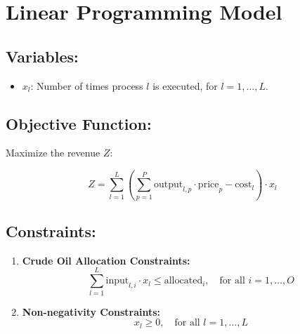 \documentclass{article}
\begin{document}
\section*{Linear Programming Model}

\subsection*{Variables:}
\begin{itemize}
    \item $x_l$: Number of times process $l$ is executed, for $l = 1, \ldots, L$.
\end{itemize}

\subsection*{Objective Function:}
Maximize the revenue $Z$:

\[
Z = \sum_{l=1}^{L} \left( \sum_{p=1}^{P} \text{output}_{l,p} \cdot \text{price}_p - \text{cost}_l \right) \cdot x_l
\]

\subsection*{Constraints:}
\begin{enumerate}
    \item \textbf{Crude Oil Allocation Constraints:}
    \[
    \sum_{l=1}^{L} \text{input}_{l,i} \cdot x_l \leq \text{allocated}_i, \quad \text{for all } i = 1, \ldots, O
    \]
    \item \textbf{Non-negativity Constraints:}
    \[
    x_l \geq 0, \quad \text{for all } l = 1, \ldots, L
    \]
\end{enumerate}
\end{document}
